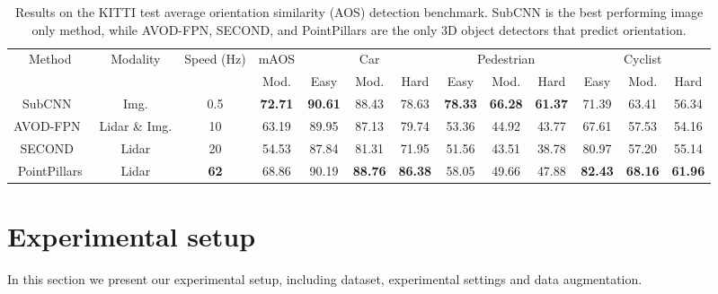 \documentclass[10pt,twocolumn,letterpaper]{article}
\newcommand{\squeeze}{\vspace{-0.5mm}}
\begin{document}
\begin{table*}[]
\small
\begin{tabular}{| c | c | c || c || c | c | c || c | c | c || c | c | c |}
\hline
\multirow{2}{*}{Method}				& \multirow{2}{*}{Modality}			& \multirow{2}{10mm}{Speed (Hz)}	& mAOS		& \multicolumn{3}{|c||}{Car}		& \multicolumn{3}{|c||}{Pedestrian}		& \multicolumn{3}{|c|}{Cyclist}	\\ \cline{4-13}
					&				& 		& Mod.		& Easy		& Mod.		& Hard		& Easy		& Mod.		& Hard		& Easy		& Mod.		& Hard	\\ \hline 
SubCNN~\cite{xiang2017subcategory}	& Img.	& 0.5		& \textbf{72.71}		&  \textbf{90.61} 	 	& 88.43 	 	& 78.63		&  \textbf{78.33}		& \textbf{66.28}	& \textbf{61.37} 	& 71.39	 & 63.41	& 56.34 	\\ \hline

AVOD-FPN~\cite{avod}	& Lidar \& Img.	& 10		& 63.19		& 89.95  	 	&  87.13	 	& 79.74		& 53.36 		& 44.92			& 43.77 	& 67.61	 	& 57.53 		& 54.16	\\ \hline
SECOND~\cite{second}	& Lidar			& 20			& 54.53		& 87.84  & 81.31	 	& 71.95		& 51.56		& 43.51			& 38.78		& 80.97 		& 57.20 		& 55.14 	\\ \hline
PointPillars			& Lidar			& \textbf{62} 	& 68.86	& 90.19		& \textbf{88.76}	& \textbf{86.38}	& 58.05	& 49.66		& 47.88		& \textbf{82.43} 		& \textbf{68.16}		& \textbf{61.96 }	\\ \hline
\end{tabular}
\caption{Results on the KITTI test average orientation similarity (AOS) detection benchmark. SubCNN is the best performing image only method, while AVOD-FPN, SECOND, and PointPillars are the only 3D object detectors that predict orientation.}\label{table:res_aos}

\end{table*}


\section{Experimental setup}
\squeeze
In this section we present our experimental setup, including dataset, experimental settings and data augmentation.
\end{document}

